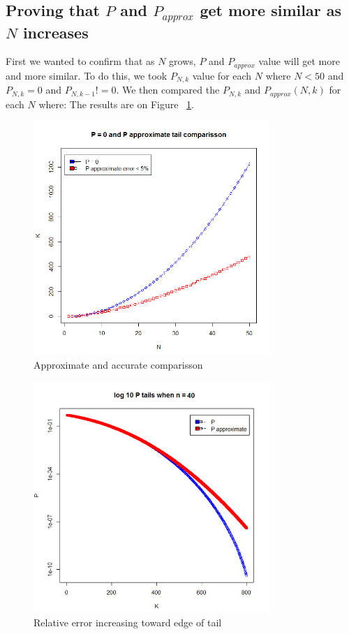 \documentclass[12pt]{article}
\begin{document}
\subsection{Proving that $P$ and $P_{approx}$ get more similar as $N$ increases}
First we wanted to confirm that as $N$ grows, $P$ and $P_{approx}$ value will get more and more similar. To do this, we took $P_{N, k}$ value for each $N$ where
$N < 50$ and $P_{N, k}  = 0$ and $P_{N, k - 1} != 0$.
We then compared the $P_{N, k}$ and $P_{approx} (N, k)$ for each $N$ where:
The results are on Figure ~\ref{fig:T0vsN}.


\begin{figure}[!ht]
	\centering
  \includegraphics[width=0.8\textwidth]{T0vsN}
	\caption{Approximate and accurate comparisson}
	\label{fig:T0vsN}
\end{figure}

\begin{figure}[!ht]
	\centering
  \includegraphics[width=0.8\textwidth]{log10PtailsN40}
	\caption{Relative error increasing toward edge of tail}
	\label{fig:log10PtailsN40}
\end{figure}
\end{document}
